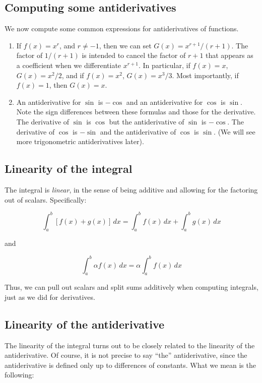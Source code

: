 \documentclass[10pt]{amsart}
\begin{document}
\subsection{Computing some antiderivatives}

We now compute some common expressions for antiderivatives of functions.

\begin{enumerate}
\item If $f(x) = x^r$, and $r \ne -1$, then we can set $G(x) = x^{r +
  1}/(r + 1)$. The factor of $1/(r + 1)$ is intended to cancel the
  factor of $r + 1$ that appears as a coefficient when we
  differentiate $x^{r + 1}$. In particular, if $f(x) = x$, $G(x) =
  x^2/2$, and if $f(x) = x^2$, $G(x) = x^3/3$. Most importantly, if
  $f(x) = 1$, then $G(x) = x$.
\item An antiderivative for $\sin$ is $-\cos$ and an antiderivative
  for $\cos$ is $\sin$. Note the sign differences between these
  formulas and those for the derivative. The derivative of $\sin$ is
  $\cos$ but the antiderivative of $\sin$ is $-\cos$. The derivative
  of $\cos$ is $-\sin$ and the antiderivative of $\cos$ is $\sin$. (We
  will see more trigonometric antiderivatives later).
\end{enumerate}

\subsection{Linearity of the integral}

The integral is {\em linear}, in the sense of being additive and
allowing for the factoring out of scalars. Specifically:

$$\int_a^b [f(x) + g(x)] \, dx = \int_a^b f(x) \, dx + \int_a^b g(x) \, dx$$

and

$$\int_a^b \alpha f(x) \, dx = \alpha \int_a^b f(x) \, dx$$

Thus, we can pull out scalars and split sums additively when computing
integrals, just as we did for derivatives.

\subsection{Linearity of the antiderivative}

The linearity of the integral turns out to be closely related to the
linearity of the antiderivative. Of course, it is not precise to say
``the'' antiderivative, since the antiderivative is defined only up to
differences of constants. What we mean is the following:
\end{document}
